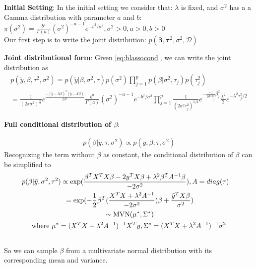 \textbf{Initial Setting}:
In the initial setting we consider that: $\lambda$ is fixed, and $\sigma^2$ has a a Gamma distribution with parameter $a$ and $b$: $\pi(\sigma^2) = \frac{b^a}{\Gamma(a)} (\sigma^2)^{-a-1}e^{-b^2/\sigma^2},\sigma^2>0,a>0,b>0$ \\
Our first step is to write the joint distribution: $p(\mathbf{\beta},\mathbf{\tau}^2,\sigma^{2},\mathcal{D})$

\textbf{Joint distributional form}:
Given \autoref{eq:blassocond}, we can write the joint distribution as
\begin{equation}
	\begin{multlined}
		p(\tilde{y},\beta,\tau^2,\sigma^2) = p(\tilde{y}|\beta,\sigma^2,\tau)p(\sigma^2)\prod_{j=1}^p p(\beta|\sigma^2,\tau_j)p(\tau_j^2)\\
		=\frac{1}{(2\pi\sigma^2)^{\frac{n}{2}}} e^{\frac{-(\tilde{y} -X\beta)^T(\tilde{y}-X\beta)}{2\sigma^2}}
		\frac{b^a}{\Gamma(a)} (\sigma^2)^{-a-1}e^{-b^2/\sigma^2}
		\prod_{j=1}^p \frac{1}{(2\sigma^2\tau_j^2)^{1/2}}e^{-\frac{-1}{2\sigma^2\tau_j^2}\beta_j^2}\frac{\lambda^2}{2}e^{-\lambda^2\tau_j^2/2}
	\end{multlined}
\end{equation}

\textbf{Full conditional distribution of $\beta$}:

\begin{equation}
	\begin{multlined}
		p(\beta | \tilde{y},\tau,\sigma^2) \propto  	p(\tilde{y},\beta,\tau,\sigma^2)
	\end{multlined}
\end{equation}
Recognizing the term without $\beta$ as constant, the conditional distribution of $\beta$ can be simplified to
\begin{equation}
	\begin{multlined}
	p(\beta|\tilde{y},\sigma^2,\tau^2) \propto \textnormal{exp}(\frac{\beta^TX^TX\beta - 2y^TX\beta +\lambda^2\beta^TA^{-1}\beta}{-2\sigma^2}), A = diag(\tau)\\
	=  \textnormal{exp}(-\frac{1}{2}\beta^T(\frac{X^TX + \lambda^2A^{-1}}{-2\sigma^2})\beta + \frac{\tilde{y}^TX\beta}{\sigma^2})\\
	\sim \textnormal{MVN}(\mu^*,\Sigma^*)\\
	\textnormal{where } \mu^* = (X^TX+\lambda^2A^{-1})^{-1}X^Ty, \Sigma^* = (X^TX+\lambda^2A^{-1})^{-1}\sigma^2\\
	\end{multlined}
\end{equation}
So we can sample $\beta$ from a multivariate normal distribution with its corresponding mean and variance.

